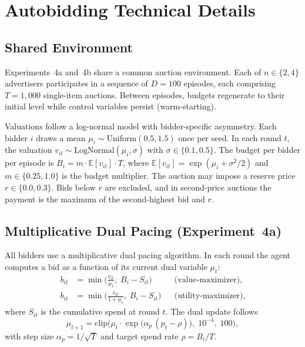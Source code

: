 \section{Autobidding Technical Details}
\label{sec:exp4_appendix}

\subsection{Shared Environment}

Experiments~4a and~4b share a common auction environment. Each of $n \in \{2, 4\}$ advertisers participates in a sequence of $D = 100$ episodes, each comprising $T = 1{,}000$ single-item auctions. Between episodes, budgets regenerate to their initial level while control variables persist (warm-starting).

Valuations follow a log-normal model with bidder-specific asymmetry. Each bidder $i$ draws a mean $\mu_i \sim \mathrm{Uniform}(0.5, 1.5)$ once per seed. In each round $t$, the valuation $v_{it} \sim \mathrm{LogNormal}(\mu_i, \sigma)$ with $\sigma \in \{0.1, 0.5\}$. The budget per bidder per episode is $B_i = m \cdot \mathbb{E}[v_{it}] \cdot T$, where $\mathbb{E}[v_{it}] = \exp(\mu_i + \sigma^2/2)$ and $m \in \{0.25, 1.0\}$ is the budget multiplier. The auction may impose a reserve price $r \in \{0.0, 0.3\}$. Bids below $r$ are excluded, and in second-price auctions the payment is the maximum of the second-highest bid and $r$.

\subsection{Multiplicative Dual Pacing (Experiment~4a)}
\label{sec:exp4a_appendix}

All bidders use a multiplicative dual pacing algorithm. In each round the agent computes a bid as a function of its current dual variable $\mu_t$:
\begin{align}
  b_{it} &= \min\!\Big(\frac{v_{it}}{\mu_t},\; B_i - S_{it}\Big) & &\text{(value-maximizer),} \label{eq:bid_vmax} \\
  b_{it} &= \min\!\Big(\frac{v_{it}}{1 + \mu_t},\; B_i - S_{it}\Big) & &\text{(utility-maximizer),} \label{eq:bid_umax}
\end{align}
where $S_{it}$ is the cumulative spend at round $t$. The dual update follows
\begin{equation}
  \mu_{t+1} = \mathrm{clip}\!\Big(\mu_t \cdot \exp\!\big(\alpha_p\,(p_t - \rho)\big),\; 10^{-4},\; 100\Big),
  \label{eq:dual_update_exp4a}
\end{equation}
with step size $\alpha_p = 1/\sqrt{T}$ and target spend rate $\rho = B_i / T$.

